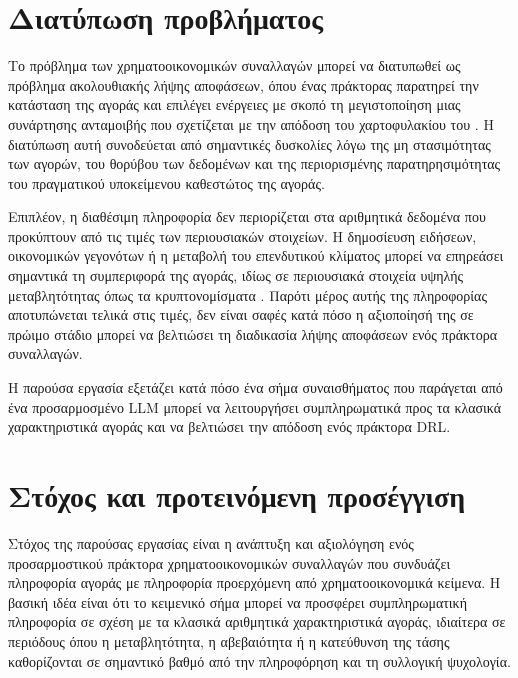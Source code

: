 \section{Διατύπωση προβλήματος}
Το πρόβλημα των χρηματοοικονομικών συναλλαγών μπορεί να διατυπωθεί ως πρόβλημα 
ακολουθιακής λήψης αποφάσεων, όπου ένας πράκτορας παρατηρεί την κατάσταση της 
αγοράς και επιλέγει ενέργειες με σκοπό τη μεγιστοποίηση μιας συνάρτησης 
ανταμοιβής που σχετίζεται με την απόδοση του χαρτοφυλακίου του 
\cite{moody2001rltrading, deng2016drltrading, hambly2023rlfinance}. 
Η διατύπωση αυτή συνοδεύεται από σημαντικές δυσκολίες λόγω της μη στασιμότητας 
των αγορών, του θορύβου των δεδομένων και της περιορισμένης παρατηρησιμότητας 
του πραγματικού υποκείμενου καθεστώτος της αγοράς.

Επιπλέον, η διαθέσιμη πληροφορία δεν περιορίζεται στα αριθμητικά δεδομένα 
που προκύπτουν από τις τιμές των περιουσιακών στοιχείων. Η δημοσίευση ειδήσεων, 
οικονομικών γεγονότων ή η μεταβολή του επενδυτικού κλίματος μπορεί να επηρεάσει 
σημαντικά τη συμπεριφορά της αγοράς, ιδίως σε περιουσιακά στοιχεία υψηλής 
μεταβλητότητας όπως τα κρυπτονομίσματα \cite{kraaijeveld2020twitter}.
Παρότι μέρος αυτής της πληροφορίας αποτυπώνεται τελικά στις τιμές, δεν είναι 
σαφές κατά πόσο η αξιοποίησή της σε πρώιμο στάδιο μπορεί να βελτιώσει τη 
διαδικασία λήψης αποφάσεων ενός πράκτορα συναλλαγών.

Η παρούσα εργασία εξετάζει κατά πόσο ένα σήμα συναισθήματος που παράγεται από 
ένα προσαρμοσμένο LLM μπορεί να λειτουργήσει συμπληρωματικά προς τα κλασικά 
χαρακτηριστικά αγοράς και να βελτιώσει την απόδοση ενός πράκτορα DRL.

\section{Στόχος και προτεινόμενη προσέγγιση}
Στόχος της παρούσας εργασίας είναι η ανάπτυξη και αξιολόγηση ενός προσαρμοστικού 
πράκτορα χρηματοοικονομικών συναλλαγών που συνδυάζει πληροφορία αγοράς με 
πληροφορία προερχόμενη από χρηματοοικονομικά κείμενα. Η βασική ιδέα είναι ότι 
το κειμενικό σήμα μπορεί να προσφέρει συμπληρωματική πληροφορία σε σχέση με τα 
κλασικά αριθμητικά χαρακτηριστικά αγοράς, ιδιαίτερα σε περιόδους όπου η 
μεταβλητότητα, η αβεβαιότητα ή η κατεύθυνση της τάσης καθορίζονται σε σημαντικό 
βαθμό από την πληροφόρηση και τη συλλογική ψυχολογία.


